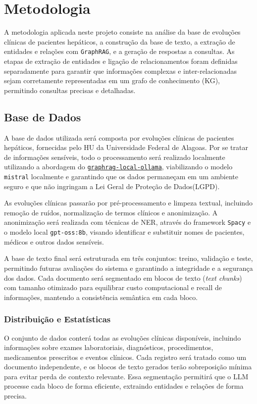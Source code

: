 \chapter{Metodologia}\label{cap:metodologia}

A metodologia aplicada neste projeto consiste na análise da base de evoluções clínicas de pacientes hepáticos, a construção da base de texto, a extração de entidades e relações com \texttt{GraphRAG}, e a geração de respostas a consultas. As etapas de extração de entidades e ligação de relacionamentos foram definidas separadamente para garantir que informações complexas e inter-relacionadas sejam corretamente representadas em um grafo de conhecimento (KG), permitindo consultas precisas e detalhadas.

\section{Base de Dados}
A base de dados utilizada será composta por evoluções clínicas de pacientes hepáticos, fornecidas pelo HU da Universidade Federal de Alagoas. Por se tratar de informações sensíveis, todo o processamento será realizado localmente utilizando a abordagem do \texttt{\href{https://github.com/TheAiSingularity/graphrag-local-ollama}{graphrag-local-ollama}}, viabilizando o modelo \texttt{mistral} localmente e garantindo que os dados permaneçam em um ambiente seguro e que não ingringam a Lei Geral de Proteção de Dados(LGPD).

As evoluções clínicas passarão por pré-processamento e limpeza textual, incluindo remoção de ruídos, normalização de termos clínicos e anonimização. A anonimização será realizada com técnicas de NER, através do framework \texttt{Spacy} e o modelo local \texttt{gpt-oss:8b}, visando identificar e substituir nomes de pacientes, médicos e outros dados sensíveis.  

A base de texto final será estruturada em três conjuntos: treino, validação e teste, permitindo futuras avaliações do sistema e garantindo a integridade e a segurança dos dados. Cada documento será segmentado em blocos de texto (\textit{text chunks}) com tamanho otimizado para equilibrar custo computacional e recall de informações, mantendo a consistência semântica em cada bloco.

\subsection{Distribuição e Estatísticas}
O conjunto de dados conterá todas as evoluções clínicas disponíveis, incluindo informações sobre exames laboratoriais, diagnósticos, procedimentos, medicamentos prescritos e eventos clínicos. Cada registro será tratado como um documento independente, e os blocos de texto gerados terão sobreposição mínima para evitar perda de contexto relevante. Essa segmentação permitirá que o LLM processe cada bloco de forma eficiente, extraindo entidades e relações de forma precisa.

